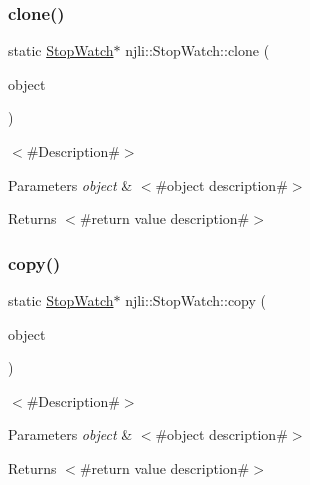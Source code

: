 \subsubsection{\texorpdfstring{clone()}{clone()}}
{\footnotesize\ttfamily static \mbox{\hyperlink{classnjli_1_1_stop_watch}{Stop\+Watch}}$\ast$ njli\+::\+Stop\+Watch\+::clone (\begin{DoxyParamCaption}\item[{const \mbox{\hyperlink{classnjli_1_1_stop_watch}{Stop\+Watch}} \&}]{object }\end{DoxyParamCaption})\hspace{0.3cm}{\ttfamily [static]}}

$<$\#\+Description\#$>$


\begin{DoxyParams}{Parameters}
{\em object} & $<$\#object description\#$>$\\
\hline
\end{DoxyParams}
\begin{DoxyReturn}{Returns}
$<$\#return value description\#$>$ 
\end{DoxyReturn}
\mbox{\label{classnjli_1_1_stop_watch_a828bdc3414c97fa1537416548dffc803}} 
\subsubsection{\texorpdfstring{copy()}{copy()}}
{\footnotesize\ttfamily static \mbox{\hyperlink{classnjli_1_1_stop_watch}{Stop\+Watch}}$\ast$ njli\+::\+Stop\+Watch\+::copy (\begin{DoxyParamCaption}\item[{const \mbox{\hyperlink{classnjli_1_1_stop_watch}{Stop\+Watch}} \&}]{object }\end{DoxyParamCaption})\hspace{0.3cm}{\ttfamily [static]}}

$<$\#\+Description\#$>$


\begin{DoxyParams}{Parameters}
{\em object} & $<$\#object description\#$>$\\
\hline
\end{DoxyParams}
\begin{DoxyReturn}{Returns}
$<$\#return value description\#$>$ 
\end{DoxyReturn}
\mbox{\label{classnjli_1_1_stop_watch_a83a8876ae63b92804004cf3febe76573}} 
